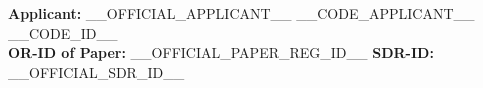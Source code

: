 \begin{tcolorbox}[colback=white, colframe=black, boxrule=0.5pt]

\textbf{Applicant:} __OFFICIAL_APPLICANT__ \hfill __CODE_APPLICANT__ __CODE_ID__ \\
\textbf{OR-ID of Paper:} __OFFICIAL_PAPER_REG_ID__ \hfill \textbf{SDR-ID:} __OFFICIAL_SDR_ID__

\end{tcolorbox}
